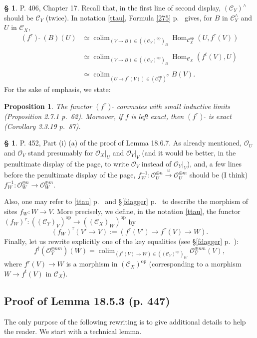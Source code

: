 \documentclass[12pt]{article}
\newtheorem{prop}[thm]{Proposition}
\theoremstyle{remark}
\theoremstyle{definition}
\newtheorem{s}[thm]{\S}
\newcommand{\cc}{\mathcal}
\newcommand{\C}{\mathcal C}
\newcommand{\xr}{\xrightarrow}
\DeclareMathOperator*{\co}{colim}
\DeclareMathOperator{\Hom}{Hom}%
\DeclareMathOperator{\op}{op}
\begin{document}
\begin{s}\label{fhat}
P. 406, Chapter 17. Recall that, in the first line of second display, $(\C_Y)^\wedge$ should be $\C_Y$ (twice). In notation \eqref{ttau}, Formula \eqref{275} p.~\pageref{275} gives, for $B$ in $\C_Y^\wedge$ and $U$ in $\C_X$,
%
\begin{equation*}
\begin{split}
(f^\tau)\ \widehat{}\ (B)(U)&\simeq\co_{(V\to B)\in((\C_Y)^{\op})_B}\Hom_{\C_X^{\op}}(U,f^\tau(V))
\\ \\ 
{}&\simeq\co_{(V\to B)\in((\C_Y)^{\op})_B}\Hom_{\C_X}(f^t(V),U)\\ \\ 
{}&\simeq\co_{(U\to f^\tau(V))\in(\C_Y^{\op})^U}B(V).
\end{split}
\end{equation*}
%
For the sake of emphasis, we state: 
%
\begin{prop}\label{p406}
The functor $(f^\tau)\ \widehat{}$ commutes with small inductive limits (Proposition 2.7.1 p.~62). Moreover, if $f$ is left exact, then $(f^\tau)\ \widehat{}$ is exact (Corollary 3.3.19 p.~87).
\end{prop}
\end{s}
%
%
\begin{s}\label{1867}
P. 452, Part (i) (a) of the proof of Lemma 18.6.7. As already mentioned, $\cc O_U$ and $\cc O_V$ stand presumably for $\cc O_X|_U$ and $\cc O_Y|_V$ (and it would be better, in the penultimate display of the page, to write $\cc O_V$ instead of $\cc O_Y|_V$), and, a few lines before the penultimate display of the page, $f_W^{-1}:\cc O_U^{\oplus n}\xr u\cc O_U^{\oplus m}$ should be (I think) $f_W^{-1}:\cc O_W^{\oplus n}\to\cc O_W^{\oplus m}$. 

Also, one may refer to \eqref{ttau} p.~\pageref{ttau} and \S\ref{fdagger} p.~\pageref{fdagger} to describe the morphism of sites $f_W:W\to V$. More precisely, we define, in the notation \eqref{ttau}, the functor $(f_W)^\tau:((\C_Y)_V)^{\op}\to((\C_X)_W)^{\op}$ by
$$
(f_W)^\tau(V'\to V):=(f^\tau(V')\to f^\tau(V)\to W).
$$
Finally, let us rewrite explicitly one of the key equalities (see \S\ref{fdagger} p.~\pageref{fdagger}): 
$$
f^\dagger(\cc O_Y^{\oplus nm})(W)=\co_{(f^\tau(V)\to W)\in((\C_Y)^{\op})_W}\cc O_Y^{\oplus nm}(V),
$$ 
where $f^\tau(V)\to W$ is a morphism in $(\C_X)^{\op}$ (corresponding to a morphism $W\to f^t(V)$ in $\C_X$).
\end{s}
%
\subsection{Proof of Lemma 18.5.3 (p. 447)}\label{1853}
%
The only purpose of the following rewriting is to give additional details to help the reader. We start with a technical lemma.
\end{document}
